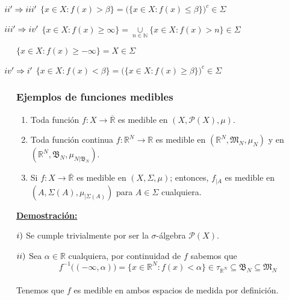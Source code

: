 \documentclass[12pt,a4paper]{article}
\newcommand{\R}{\mathbb{R}}
\newcommand{\N}{\mathbb{N}}
\newcommand{\smallcup}{\mathop{\cup}\limits}
\newcounter{unit}[section]
\newcounter{chapter}[unit]
\renewcommand{\theunit}{\arabic{unit}}
\renewcommand{\thechapter}{\arabic{chapter}}
\renewcommand{\thesubsubsection}{\theunit.\thechapter.\arabic{subsubsection}}
\newcommand{\result}[1]{%
  \subsubsection{#1}%
  \label{result:\thesubsubsection}
}
\newcommand{\dem}{
    \noindent \underline{\textbf{Demostración:}}
}
\begin{document}
\vspace{2mm}
\begin{tcolorbox}   
    $\hspace{-5mm} \romannumeral 2' \Rightarrow \romannumeral 3'$ \hspace{3mm} $\{x \in X : f(x) > \beta\} = \Big(\{x \in X : f(x) \leq \beta\}\Big)^c \in \Sigma$  
\end{tcolorbox}

\vspace{2mm}
\begin{tcolorbox}   
    $\hspace{-5mm} \romannumeral 3' \Rightarrow \romannumeral 4'$ \hspace{3mm} $\{x \in X : f(x) \geq \infty\} = \smallcup_{n\in\N} \{x \in X : f(x) > n\} \in \Sigma$  
\end{tcolorbox}
$\{x \in X : f(x) \geq -\infty\} = X \in \Sigma$

\vspace{4mm}
\begin{tcolorbox}   
    $\hspace{-5mm} \romannumeral 4' \Rightarrow \romannumeral 1'$ \hspace{3mm} $\{x \in X : f(x) < \beta\} = \Big(\{x \in X : f(x) \geq \beta\}\Big)^c \in \Sigma$  
\end{tcolorbox}

\vspace{6mm}
\result{Ejemplos de funciones medibles}
\begin{enumerate}[label=\roman*)]
    \item Toda función $f : X \rightarrow \overline{\R}$ es medible en $(X, \mathcal{P}(X), \mu)$.
    \item Toda función continua $f: \R^N \longrightarrow \R$ es medible en $(\R^N, \mathfrak{M}_N, \mu_N)$ y en $(\R^N, \mathfrak{B}_N, \mu_{N|\mathfrak{B}_N})$.
    \item Si $f: X \longrightarrow \overline{\R}$ es medible en $(X, \Sigma, \mu)$; entonces, $f_{|A}$ es medible en $(A, \Sigma(A), \mu_{|\Sigma(A)})$ para $A \in \Sigma$ cualquiera.
\end{enumerate}

\vspace{2mm} \dem

\vspace{1mm} $\romannumeral 1)$ Se cumple trivialmente por ser la $\sigma$-álgebra $\mathcal{P}(X)$.

\vspace{4mm} $\romannumeral 2)$ Sea $\alpha \in \R$ cualquiera, por continuidad de $f$ sabemos que
\\[-2ex] $$f^{-1}\bigg((-\infty, \alpha)\bigg) = \{x \in \R^N : f(x) < \alpha\} \in \tau_{\R^N} \subseteq \mathfrak{B}_N \subseteq \mathfrak{M}_N$$ \\[-3ex]
Tenemos que $f$ es medible en ambos espacios de medida por definición.
\end{document}
